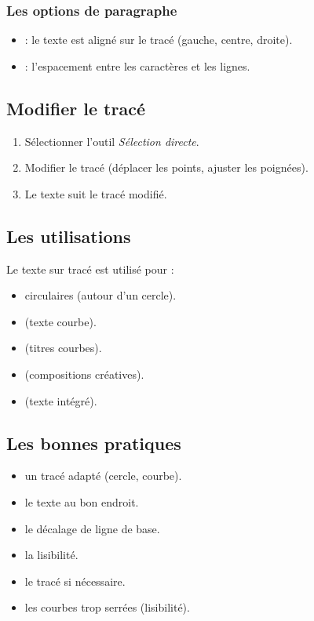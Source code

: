 \subsubsection{Les options de paragraphe}

\begin{itemize}
    \item {} : le texte est aligné sur le tracé (gauche, centre, droite).
    \item {} : l'espacement entre les caractères et les lignes.
\end{itemize}

\subsection{Modifier le tracé}

\begin{enumerate}
    \item Sélectionner l'outil \emph{Sélection directe}.
    \item Modifier le tracé (déplacer les points, ajuster les poignées).
    \item Le texte suit le tracé modifié.
\end{enumerate}

\subsection{Les utilisations}

Le texte sur tracé est utilisé pour :

\begin{itemize}
    \item {} circulaires (autour d'un cercle).
    \item {} (texte courbe).
    \item {} (titres courbes).
    \item {} (compositions créatives).
    \item {} (texte intégré).
\end{itemize}

\subsection{Les bonnes pratiques}

\begin{itemize}
    \item {} un tracé adapté (cercle, courbe).
    \item {} le texte au bon endroit.
    \item {} le décalage de ligne de base.
    \item {} la lisibilité.
    \item {} le tracé si nécessaire.
    \item {} les courbes trop serrées (lisibilité).
\end{itemize}

